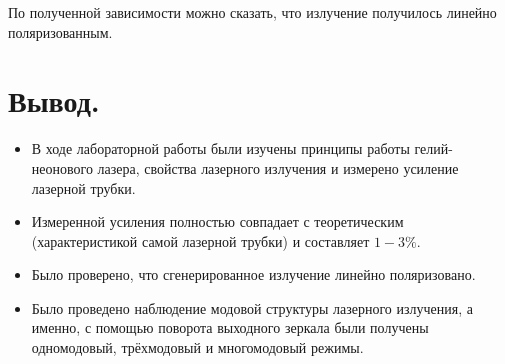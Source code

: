 \documentclass[a4paper, 12pt, twoside]{article}
\begin{document}
	По полученной зависимости можно сказать, что излучение получилось линейно поляризованным.
	
	\section{Вывод.}
	\begin{itemize}
		\item В ходе лабораторной работы были изучены принципы работы гелий-неонового лазера, свойства лазерного излучения и измерено усиление лазерной трубки.
		
		\item Измеренной усиления полностью совпадает с теоретическим (характеристикой самой лазерной трубки) и составляет $1-3 \%$.
		
		\item Было проверено, что сгенерированное излучение линейно поляризовано.
		
		\item Было проведено наблюдение модовой структуры лазерного излучения, а именно, с помощью поворота выходного зеркала были получены одномодовый, трёхмодовый и многомодовый режимы.
	\end{itemize}
\end{document}
